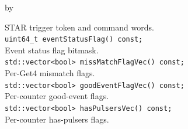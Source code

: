 \documentclass[twoside]{article}
\newcommand{\entrylabel}[1]{\mbox{\textbf{{#1}}}\hfil}%
\newenvironment{entry}
{\begin{list}{}%
    {\renewcommand{\makelabel}{\entrylabel}%
     \setlength{\labelwidth}{90pt}%
     \setlength{\leftmargin}{\labelwidth}
     \advance\leftmargin by \labelsep%
      }%
    }%
  {\end{list}}
\newcommand{\Entrylabel}[1]%
{\raisebox{0pt}[1ex][0pt]{\makebox[\labelwidth][l]%
    {\parbox[t]{\labelwidth}{\hspace{0pt}\textbf{{#1}}}}}}
\newenvironment{Entry}%
{\renewcommand{\entrylabel}{\Entrylabel}\begin{entry}}%
  {\end{entry}}
\begin{document}
\begin{Entry}
    STAR trigger token and command words.\\
    \verb+uint64_t eventStatusFlag() const;+\\
    Event status flag bitmask.\\
    \verb+std::vector<bool> missMatchFlagVec() const;+\\
    Per-Get4 mismatch flags.\\
    \verb+std::vector<bool> goodEventFlagVec() const;+\\
    Per-counter good-event flags.\\
    \verb+std::vector<bool> hasPulsersVec() const;+\\
    Per-counter has-pulsers flags.\\
\end{Entry}
\clearpage

\end{document}
